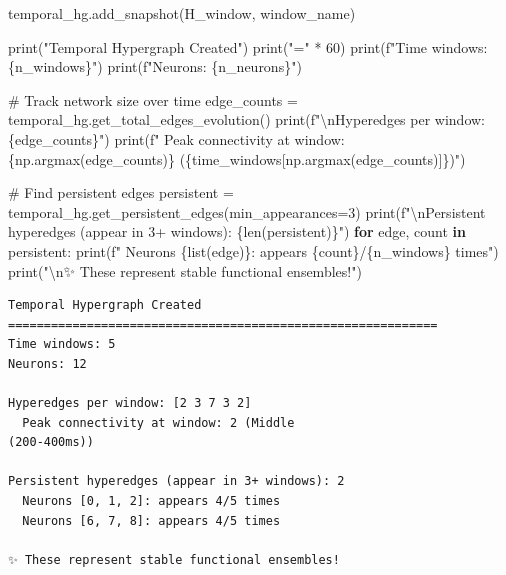\documentclass[
  11pt,
  letterpaper,
  oneside,
  openany]{book}
\newenvironment{Shaded}{\begin{snugshade}}{\end{snugshade}}
\newcommand{\BuiltInTok}[1]{\textcolor[rgb]{0.00,0.23,0.31}{#1}}
\newcommand{\CharTok}[1]{\textcolor[rgb]{0.13,0.47,0.30}{#1}}
\newcommand{\CommentTok}[1]{\textcolor[rgb]{0.37,0.37,0.37}{#1}}
\newcommand{\ControlFlowTok}[1]{\textcolor[rgb]{0.00,0.23,0.31}{\textbf{#1}}}
\newcommand{\DecValTok}[1]{\textcolor[rgb]{0.68,0.00,0.00}{#1}}
\newcommand{\KeywordTok}[1]{\textcolor[rgb]{0.00,0.23,0.31}{\textbf{#1}}}
\newcommand{\NormalTok}[1]{\textcolor[rgb]{0.00,0.23,0.31}{#1}}
\newcommand{\OperatorTok}[1]{\textcolor[rgb]{0.37,0.37,0.37}{#1}}
\newcommand{\SpecialCharTok}[1]{\textcolor[rgb]{0.37,0.37,0.37}{#1}}
\newcommand{\SpecialStringTok}[1]{\textcolor[rgb]{0.13,0.47,0.30}{#1}}
\newcommand{\StringTok}[1]{\textcolor[rgb]{0.13,0.47,0.30}{#1}}
\begin{document}
\begin{Shaded}
\begin{Highlighting}[]
\NormalTok{    temporal\_hg.add\_snapshot(H\_window, window\_name)}

\BuiltInTok{print}\NormalTok{(}\StringTok{"Temporal Hypergraph Created"}\NormalTok{)}
\BuiltInTok{print}\NormalTok{(}\StringTok{"="} \OperatorTok{*} \DecValTok{60}\NormalTok{)}
\BuiltInTok{print}\NormalTok{(}\SpecialStringTok{f"Time windows: }\SpecialCharTok{\{}\NormalTok{n\_windows}\SpecialCharTok{\}}\SpecialStringTok{"}\NormalTok{)}
\BuiltInTok{print}\NormalTok{(}\SpecialStringTok{f"Neurons: }\SpecialCharTok{\{}\NormalTok{n\_neurons}\SpecialCharTok{\}}\SpecialStringTok{"}\NormalTok{)}

\CommentTok{\# Track network size over time}
\NormalTok{edge\_counts }\OperatorTok{=}\NormalTok{ temporal\_hg.get\_total\_edges\_evolution()}
\BuiltInTok{print}\NormalTok{(}\SpecialStringTok{f"}\CharTok{\textbackslash{}n}\SpecialStringTok{Hyperedges per window: }\SpecialCharTok{\{}\NormalTok{edge\_counts}\SpecialCharTok{\}}\SpecialStringTok{"}\NormalTok{)}
\BuiltInTok{print}\NormalTok{(}\SpecialStringTok{f"  Peak connectivity at window: }\SpecialCharTok{\{}\NormalTok{np}\SpecialCharTok{.}\NormalTok{argmax(edge\_counts)}\SpecialCharTok{\}}\SpecialStringTok{ (}\SpecialCharTok{\{}\NormalTok{time\_windows[np.argmax(edge\_counts)]}\SpecialCharTok{\}}\SpecialStringTok{)"}\NormalTok{)}

\CommentTok{\# Find persistent edges}
\NormalTok{persistent }\OperatorTok{=}\NormalTok{ temporal\_hg.get\_persistent\_edges(min\_appearances}\OperatorTok{=}\DecValTok{3}\NormalTok{)}
\BuiltInTok{print}\NormalTok{(}\SpecialStringTok{f"}\CharTok{\textbackslash{}n}\SpecialStringTok{Persistent hyperedges (appear in 3+ windows): }\SpecialCharTok{\{}\BuiltInTok{len}\NormalTok{(persistent)}\SpecialCharTok{\}}\SpecialStringTok{"}\NormalTok{)}
\ControlFlowTok{for}\NormalTok{ edge, count }\KeywordTok{in}\NormalTok{ persistent:}
    \BuiltInTok{print}\NormalTok{(}\SpecialStringTok{f"  Neurons }\SpecialCharTok{\{}\BuiltInTok{list}\NormalTok{(edge)}\SpecialCharTok{\}}\SpecialStringTok{: appears }\SpecialCharTok{\{}\NormalTok{count}\SpecialCharTok{\}}\SpecialStringTok{/}\SpecialCharTok{\{}\NormalTok{n\_windows}\SpecialCharTok{\}}\SpecialStringTok{ times"}\NormalTok{)}
\BuiltInTok{print}\NormalTok{(}\StringTok{"}\CharTok{\textbackslash{}n}\StringTok{✨ These represent stable functional ensembles!"}\NormalTok{)}
\end{Highlighting}
\end{Shaded}

\begin{verbatim}
Temporal Hypergraph Created
============================================================
Time windows: 5
Neurons: 12

Hyperedges per window: [2 3 7 3 2]
  Peak connectivity at window: 2 (Middle
(200-400ms))

Persistent hyperedges (appear in 3+ windows): 2
  Neurons [0, 1, 2]: appears 4/5 times
  Neurons [6, 7, 8]: appears 4/5 times

✨ These represent stable functional ensembles!
\end{verbatim}
\end{document}
